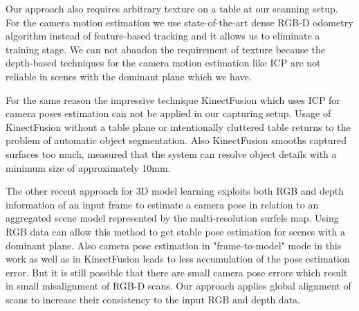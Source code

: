 \documentclass[letterpaper, 10 pt, conference]{ieeeconf}  %
\begin{document}
Our approach also requires arbitrary
texture on a table at our scanning setup. For the camera motion estimation 
we use state-of-the-art dense RGB-D odometry algorithm \cite{steinbrucker2011real} 
instead of feature-based tracking 
and it allows us to eliminate a training stage.
We can not abandon the requirement of texture because the depth-based
techniques for the camera motion estimation like ICP \cite{besl1992method} 
are not reliable in scenes with the dominant plane \cite{rusinkiewicz2001efficient} which we have.


For the same reason
the impressive technique KinectFusion \cite{newcombe2011kinectfusion} 
which uses ICP for camera poses estimation can not be applied in our capturing setup.
Usage of KinectFusion without a table plane or intentionally cluttered table 
returns to the problem of automatic object segmentation.
Also KinectFusion smooths captured surfaces too much, \cite{meister2012when} measured that
the system can resolve object details with a minimum size of approximately 10mm.

The other recent approach \cite{stuckler2012model} for 3D model learning 
exploits both RGB and depth information of an input frame to estimate a camera pose 
in relation to an aggregated scene model represented by the multi-resolution surfels map.
Using RGB data can allow this method to get stable pose estimation
for scenes with a dominant plane. Also camera pose estimation in "frame-to-model" mode
in this work as well as in KinectFusion leads to less accumulation of the pose estimation error. 
But it is still possible that there are small camera pose errors which result in
small misalignment of RGB-D scans. Our approach applies global alignment of scans
to increase their consistency to the input RGB and depth data.
\end{document}

